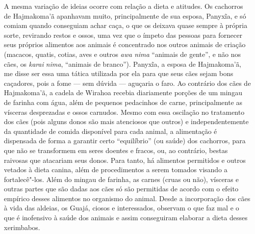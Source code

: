 A mesma variação de ideias ocorre com relação a dieta e atitudes. Os
cachorros de Hajmakoma'ã apanhavam muito, principalmente de sua esposa,
Panyxĩa, e só comiam quando conseguiam achar caça, o que os deixava
quase sempre à própria sorte, revirando restos e ossos, uma vez que o
ímpeto das pessoas para fornecer seus próprios alimentos aos animais é
concentrado nos outros animais de criação (macacos, quatis, cotias, aves
e outros \emph{awa} \emph{nima} ``animais de gente'', e não nos cães, os
\emph{karai} \emph{nima}, ``animais de branco''). Panyxĩa, a esposa de
Hajmakoma'ã, me disse ser essa uma tática utilizada por ela para que
seus cães sejam bons caçadores, pois a fome --- sem dúvida --- aguçaria o
faro. Ao contrário dos cães de Hajmakoma'ã, a cadela de Wirahoa recebia
diariamente porções de um mingau de farinha com água, além de pequenos
pedacinhos de carne, principalmente as vísceras desprezadas e ossos
carnudos. Mesmo com essa oscilação no tratamento dos cães (pois alguns
donos são mais atenciosos que outros) e independentemente da quantidade
de comida disponível para cada animal, a alimentação é dispensada de
forma a garantir certo ``equilíbrio'' (ou saúde) dos cachorros, para que
não se transformem em seres doentes e fracos, ou, ao contrário, bestas
raivosas que atacariam seus donos. Para tanto, há alimentos permitidos e
outros vetados à dieta canina, além de procedimentos a serem tomados
visando a fortalecê"-los. Além do mingau de farinha, as carnes (cruas ou
não), vísceras e outras partes que são dadas aos cães só são permitidas
de acordo com o efeito empírico desses alimentos no organismo do animal.
Desde a incorporação dos cães à vida das aldeias, os Guajá, ciosos e
interessados, observam o que faz mal e o que é inofensivo à saúde dos
animais e assim conseguiram elaborar a dieta desses xerimbabos.

